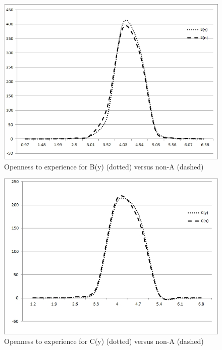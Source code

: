 \documentclass{AISB2008}
\begin{document}
\begin{figure}[!ht]
\centering
\includegraphics[width=\columnwidth]{images/openB.jpg}
\caption{Openness to experience for B(y) (dotted) versus non-A (dashed)}
\label{fig:openB}
\end{figure}

\begin{figure}[!ht]
\centering
\includegraphics[width=\columnwidth]{images/openC.jpg}
\caption{Openness to experience for C(y) (dotted) versus non-A (dashed)}
\label{fig:openC}
\end{figure}
\end{document}
